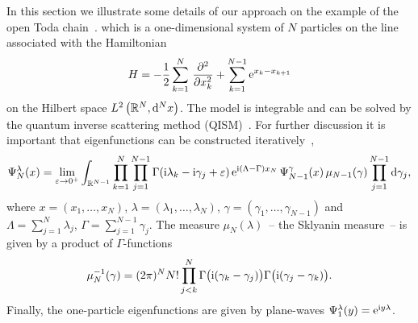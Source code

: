\documentclass[pdftex]{sigma}%
\numberwithin{equation}{section}
\begin{document}
In this section we illustrate some details of our approach on the example of the open Toda
chain~\cite{MR561316,SklyaninSoVFirstIntroTodaChain}.
which is a one-dimensional system of $N$ particles on the line associated with the Hamiltonian
\begin{gather*}
H = -\frac{1}{2}\sum_{k=1}^N \, \frac{\partial^2}{\partial x_k^2} +
\sum_{k=1}^{N-1}{\rm e}^{x_k-x_{k+1}}
\end{gather*}
on the Hilbert space $L^2\left(\mathbb{R}^N,{\rm d}^{N}x\right)$. The model is integrable and can be solved by the quantum inverse scattering
method (QISM)~\cite{MR1356514, Faddeev:1979gh}. For further discussion it is important that
eigenfunctions can be constructed iteratively~\cite{KharchevLebedevIntRepEigenfctsPeriodicTodaFromWhittakerFctRep,Kharchev:2000yj},
\begin{gather}\label{toda-rec-psi}
\Psi^\lambda_N(x) = \lim_{\varepsilon \rightarrow 0^+} \int_{\mathbb{R}^{N-1}}
\prod_{k=1}^{N}\prod_{j=1}^{N-1} \Gamma({\rm i} \lambda_k-{\rm i}\gamma_j+\varepsilon)\,
{\rm e}^{{\rm i}(\Lambda-\Gamma)x_{N}}\,\Psi_{N-1}^\gamma(x)\,
\mu_{N-1}(\gamma)\prod_{j=1}^{N-1}{{\rm d}\gamma_j},
\end{gather}
where $x=(x_1,\dots,x_N)$, $\lambda = (\lambda_1,\dots,\lambda_N )$, $\gamma = (\gamma_1,\dots,\gamma_{N-1})$ and
$\Lambda = \sum^N_{j=1}\lambda_j$, $\Gamma = \sum^{N-1}_{j=1}\gamma_j$. The measure $\mu_N(\lambda)$~-- the Sklyanin measure~-- is given
by a product of $\Gamma$-functions
\begin{gather*}
\mu_N^{-1}(\gamma) =(2\pi)^N {N!}\prod^N_{j < k}\Gamma\big({\rm i}(\gamma_k-\gamma_j)\big)
\Gamma\big({\rm i}(\gamma_j-\gamma_k)\big).
\end{gather*}
Finally, the one-particle eigenfunctions are given by plane-waves $\Psi^\lambda_1(y) = {\rm e}^{{\rm i} y \lambda}$.
\end{document}
